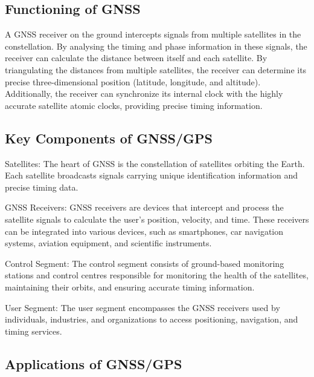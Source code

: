 \subsection{Functioning of GNSS}
A GNSS receiver on the ground intercepts signals from multiple satellites in the constellation. By analysing the timing and phase information in these signals, the receiver can calculate the distance between itself and each satellite. By triangulating the distances from multiple satellites, the receiver can determine its precise three-dimensional position (latitude, longitude, and altitude). Additionally, the receiver can synchronize its internal clock with the highly accurate satellite atomic clocks, providing precise timing information.

\subsection{Key Components of GNSS/GPS}
Satellites: The heart of GNSS is the constellation of satellites orbiting the Earth. Each satellite broadcasts signals carrying unique identification information and precise timing data.

GNSS Receivers: GNSS receivers are devices that intercept and process the satellite signals to calculate the user's position, velocity, and time. These receivers can be integrated into various devices, such as smartphones, car navigation systems, aviation equipment, and scientific instruments.

Control Segment: The control segment consists of ground-based monitoring stations and control centres responsible for monitoring the health of the satellites, maintaining their orbits, and ensuring accurate timing information.

User Segment: The user segment encompasses the GNSS receivers used by individuals, industries, and organizations to access positioning, navigation, and timing services.

\subsection{Applications of GNSS/GPS}

